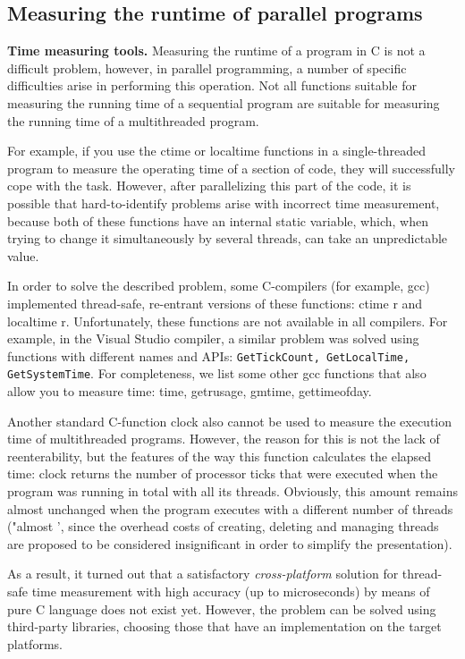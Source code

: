 { %
	\subsection{Measuring the runtime of parallel programs}
	\par\textbf{Time measuring tools.} Measuring the runtime of a program in C is not a difficult problem, however, in parallel programming, a number of specific difficulties arise in performing this operation. Not all functions suitable for measuring the running time of a sequential program are suitable for measuring the running time of a multithreaded program.
	\par For example, if you use the ctime or localtime functions in a single-threaded program to measure the operating time of a section of code, they will successfully cope with the task. However, after parallelizing this part of the code, it is possible that hard-to-identify problems arise with incorrect time measurement, because both of these functions have an internal static variable, which, when trying to change it simultaneously by several threads, can take an unpredictable value.
	\par In order to solve the described problem, some C-compilers (for example, gcc) implemented thread-safe, re-entrant versions of these functions: ctime \textunderscore r and localtime \textunderscore r. Unfortunately, these functions are not available in all compilers. For example, in the Visual Studio compiler, a similar problem was solved using functions with different names and APIs: \texttt{GetTickCount, GetLocalTime, GetSystemTime}. For completeness, we list some other gcc functions that also allow you to measure time: time, getrusage, gmtime, gettimeofday.
	\par Another standard C-function clock also cannot be used to measure the execution time of multithreaded programs. However, the reason for this is not the lack of reenterability, but the features of the way this function calculates the elapsed time: clock returns the number of processor ticks that were executed when the program was running in total with all its threads. Obviously, this amount remains almost unchanged when the program executes with a different number of threads ("almost ', since the overhead costs of creating, deleting and managing threads are proposed to be considered insignificant in order to simplify the presentation).
	\par As a result, it turned out that a satisfactory \textit{cross-platform} solution for thread-safe time measurement with high accuracy (up to microseconds) by means of pure C language does not exist yet. However, the problem can be solved using third-party libraries, choosing those that have an implementation on the target platforms.
}
